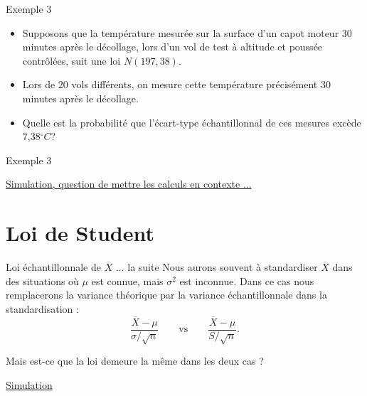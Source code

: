 \documentclass{BeamerTemplate}
\begin{document}
\begin{frame}[t]{Exemple 3}

{\small
\begin{itemize}
\item Supposons que la température mesurée sur la surface d’un capot moteur 30 minutes après le décollage, lors d’un vol de test à altitude et poussée contrôlées, suit une loi $N(197, 38)$.
\item Lors de 20 vols différents, on mesure cette température précisément 30 minutes après le décollage.
\item Quelle est la probabilité que l’écart-type échantillonnal de ces mesures excède 7,38$^{\circ} C$?
\end{itemize}

}
\end{frame}

\begin{frame}[t]{Exemple 3}


    \href{https://jmiron-exemplekhicarre.share.connect.posit.cloud/}{Simulation, question de mettre les calculs en contexte ...}
\end{frame}


\section{Loi de Student}


\begin{frame}[t]{Loi échantillonnale de $\overline{X}$ ... la suite}
   Nous aurons souvent à standardiser $\overline{X}$ dans des situations où $\mu$ est connue, mais
   $\sigma^2$ est inconnue. Dans ce cas nous remplacerons la variance
   théorique par la variance échantillonnale dans la standardisation :
   $$\frac{\overline{X}-\mu}{\sigma/\sqrt{n}}\qquad\text{vs}\qquad\frac{\overline{X}-\mu}{S/\sqrt{n}}.$$

   \medskip Mais est-ce que la loi demeure la même dans les deux cas ?

\href{https://jmiron-student.share.connect.posit.cloud/}{Simulation}
        

\end{frame}
\end{document}
